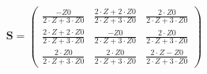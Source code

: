 \begin{equation} \mathbf{S} = \left(\begin{array}{ccc}
\frac{-Z0}{2\cdot Z+3\cdot Z0} & \frac{2\cdot Z+2\cdot Z0}{2\cdot
Z+3\cdot Z0} & \frac{2\cdot Z0}{2\cdot Z+3\cdot Z0} \\ \frac{2\cdot
Z+2\cdot Z0}{2\cdot Z+3\cdot Z0} & \frac{-Z0}{2\cdot Z+3\cdot Z0} &
\frac{2\cdot Z0}{2\cdot Z+3\cdot Z0} \\ \frac{2\cdot Z0}{2\cdot
Z+3\cdot Z0} & \frac{2\cdot Z0}{2\cdot Z+3\cdot Z0} & \frac{2\cdot
Z-Z0}{2\cdot Z+3\cdot Z0} \end{array}\right) \end{equation}
